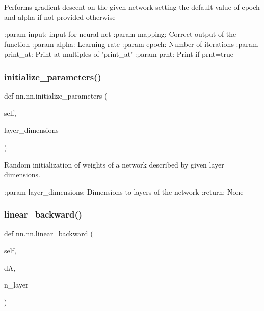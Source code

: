 \begin{DoxyVerb}Performs gradient descent on the given network setting the default value of epoch and alpha if not provided otherwise

:param input: input for neural net
:param mapping: Correct output of the function
:param alpha: Learning rate
:param epoch: Number of iterations
:param print_at: Print at multiples of 'print_at'
:param prnt: Print if prnt=true
\end{DoxyVerb}
 \mbox{\label{classnn_1_1nn_a9821fed1369b4d709fe297fe9e07d97b}} 
\subsubsection{\texorpdfstring{initialize\+\_\+parameters()}{initialize\_parameters()}}
{\footnotesize\ttfamily def nn.\+nn.\+initialize\+\_\+parameters (\begin{DoxyParamCaption}\item[{}]{self,  }\item[{}]{layer\+\_\+dimensions }\end{DoxyParamCaption})}

\begin{DoxyVerb}Random initialization of weights of a network described by given layer
dimensions.

:param layer_dimensions: Dimensions to layers of the network
:return: None
\end{DoxyVerb}
 \mbox{\label{classnn_1_1nn_a0863e90359fa30486c7161cd31c5b4e7}} 
\subsubsection{\texorpdfstring{linear\+\_\+backward()}{linear\_backward()}}
{\footnotesize\ttfamily def nn.\+nn.\+linear\+\_\+backward (\begin{DoxyParamCaption}\item[{}]{self,  }\item[{}]{dA,  }\item[{}]{n\+\_\+layer }\end{DoxyParamCaption})}

